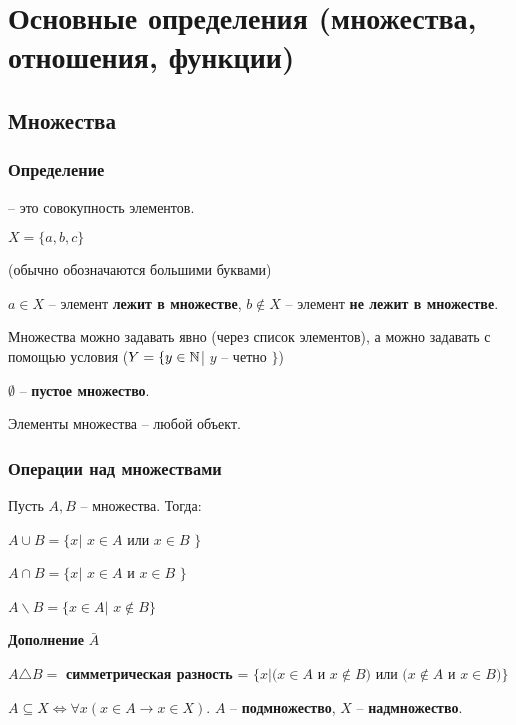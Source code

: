 \documentclass[openany]{article}
\begin{document}
   \maketitle
   \tableofcontents
   \newpage

   \section{Основные определения (множества, отношения, функции)}

   \subsection{Множества}

   \subsubsection{Определение}

   {} -- это совокупность элементов.

   $X = \{a, b, c\}$

   (обычно обозначаются большими буквами)

   $a \in X$ -- элемент \textbf{лежит в множестве}, $b \notin X$ -- элемент \textbf{не лежит в множестве}.

   Множества можно задавать явно (через список элементов), а можно задавать с помощью условия ($Y = \{ y \in \mathbb{N}$| $y$ -- четно $\}$)

   $\emptyset$ -- \textbf{пустое множество}.

   Элементы множества -- любой объект.

   \subsubsection{Операции над множествами}

   Пусть $A, B$ -- множества. Тогда:

   $A \cup B = \{x |$ $x \in A$ или $x \in B$ $\}$

   $A \cap B = \{x |$ $x \in A$ и $x \in B$ $\}$

   $A \backslash B = \{x \in A |$ $x \notin B \}$

   \textbf{Дополнение} $\bar{A}$

   $A \triangle B =$ \textbf{симметрическая разность} = $\{x | (x \in A$ и $x \notin B)$ или $(x \notin A$ и $x \in B) \}$

   $A \subseteq X \Leftrightarrow \forall x (x \in A \rightarrow x \in X)$. $A$ -- \textbf{подмножество}, $X$ -- \textbf{надмножество}.
\end{document}
